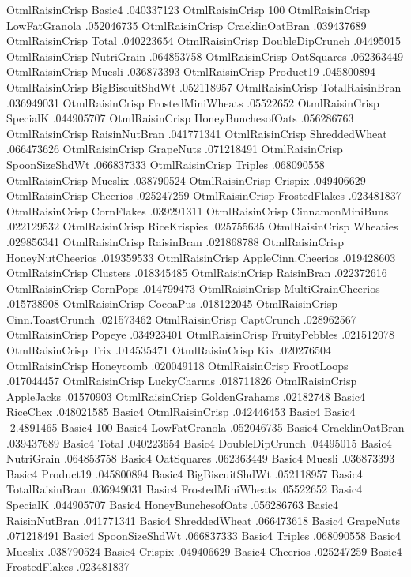 OtmlRaisinCrisp	Basic4	.040337123
OtmlRaisinCrisp	100%
OtmlRaisinCrisp	LowFatGranola	.052046735
OtmlRaisinCrisp	CracklinOatBran	.039437689
OtmlRaisinCrisp	Total	.040223654
OtmlRaisinCrisp	DoubleDipCrunch	.04495015
OtmlRaisinCrisp	NutriGrain	.064853758
OtmlRaisinCrisp	OatSquares	.062363449
OtmlRaisinCrisp	Muesli	.036873393
OtmlRaisinCrisp	Product19	.045800894
OtmlRaisinCrisp	BigBiscuitShdWt	.052118957
OtmlRaisinCrisp	TotalRaisinBran	.036949031
OtmlRaisinCrisp	FrostedMiniWheats	.05522652
OtmlRaisinCrisp	SpecialK	.044905707
OtmlRaisinCrisp	HoneyBunchesofOats	.056286763
OtmlRaisinCrisp	RaisinNutBran	.041771341
OtmlRaisinCrisp	ShreddedWheat	.066473626
OtmlRaisinCrisp	GrapeNuts	.071218491
OtmlRaisinCrisp	SpoonSizeShdWt	.066837333
OtmlRaisinCrisp	Triples	.068090558
OtmlRaisinCrisp	Mueslix	.038790524
OtmlRaisinCrisp	Crispix	.049406629
OtmlRaisinCrisp	Cheerios	.025247259
OtmlRaisinCrisp	FrostedFlakes	.023481837
OtmlRaisinCrisp	CornFlakes	.039291311
OtmlRaisinCrisp	CinnamonMiniBuns	.022129532
OtmlRaisinCrisp	RiceKrispies	.025755635
OtmlRaisinCrisp	Wheaties	.029856341
OtmlRaisinCrisp	RaisinBran	.021868788
OtmlRaisinCrisp	HoneyNutCheerios	.019359533
OtmlRaisinCrisp	AppleCinn.Cheerios	.019428603
OtmlRaisinCrisp	Clusters	.018345485
OtmlRaisinCrisp	RaisinBran	.022372616
OtmlRaisinCrisp	CornPops	.014799473
OtmlRaisinCrisp	MultiGrainCheerios	.015738908
OtmlRaisinCrisp	CocoaPus	.018122045
OtmlRaisinCrisp	Cinn.ToastCrunch	.021573462
OtmlRaisinCrisp	CaptCrunch	.028962567
OtmlRaisinCrisp	Popeye	.034923401
OtmlRaisinCrisp	FruityPebbles	.021512078
OtmlRaisinCrisp	Trix	.014535471
OtmlRaisinCrisp	Kix	.020276504
OtmlRaisinCrisp	Honeycomb	.020049118
OtmlRaisinCrisp	FrootLoops	.017044457
OtmlRaisinCrisp	LuckyCharms	.018711826
OtmlRaisinCrisp	AppleJacks	.01570903
OtmlRaisinCrisp	GoldenGrahams	.02182748
Basic4	RiceChex	.048021585
Basic4	OtmlRaisinCrisp	.042446453
Basic4	Basic4	-2.4891465
Basic4	100%
Basic4	LowFatGranola	.052046735
Basic4	CracklinOatBran	.039437689
Basic4	Total	.040223654
Basic4	DoubleDipCrunch	.04495015
Basic4	NutriGrain	.064853758
Basic4	OatSquares	.062363449
Basic4	Muesli	.036873393
Basic4	Product19	.045800894
Basic4	BigBiscuitShdWt	.052118957
Basic4	TotalRaisinBran	.036949031
Basic4	FrostedMiniWheats	.05522652
Basic4	SpecialK	.044905707
Basic4	HoneyBunchesofOats	.056286763
Basic4	RaisinNutBran	.041771341
Basic4	ShreddedWheat	.066473618
Basic4	GrapeNuts	.071218491
Basic4	SpoonSizeShdWt	.066837333
Basic4	Triples	.068090558
Basic4	Mueslix	.038790524
Basic4	Crispix	.049406629
Basic4	Cheerios	.025247259
Basic4	FrostedFlakes	.023481837
